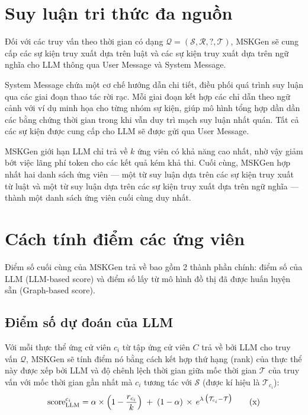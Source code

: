 \vspace{1em}
\section{Suy luận tri thức đa nguồn}
Đối với các truy vấn theo thời gian có dạng $\mathcal{Q = (S, R, ?, T)}$, MSKGen sẽ cung cấp các sự kiện truy xuất dựa trên luật và các sự kiện truy xuất dựa trên ngữ nghĩa cho LLM thông qua User Message và System Message.

System Message chứa một cơ chế hướng dẫn chi tiết, điều phối quá trình suy luận qua các giai đoạn thao tác rời rạc. Mỗi giai đoạn kết hợp các chỉ dẫn theo ngữ cảnh với ví dụ minh họa cho từng nhóm sự kiện, giúp mô hình tổng hợp dần dần các bằng chứng thời gian trong khi vẫn duy trì mạch suy luận nhất quán. Tất cả các sự kiện được cung cấp cho LLM sẽ được gửi qua User Message.

MSKGen giới hạn LLM chỉ trả về $k$ ứng viên có khả năng cao nhất, nhờ vậy giảm bớt việc lãng phí token cho các kết quả kém khả thi. Cuối cùng, MSKGen hợp nhất hai danh sách ứng viên — một từ suy luận dựa trên các sự kiện truy xuất từ luật và một từ suy luận dựa trên các sự kiện truy xuất dựa trên ngữ nghĩa — thành một danh sách ứng viên cuối cùng duy nhất.

\vspace{1em}
\section{Cách tính điểm các ứng viên}

Điểm số cuối cùng của MSKGen trả về bao gồm 2 thành phần chính: điểm số của LLM (LLM-based score) và điểm số lấy từ mô hình đồ thị đã được huấn luyện sẵn (Graph-based score).

\vspace{1em}
\subsection{Điểm số dự đoán của LLM}

Với mỗi thực thể ứng cử viên $c_i$ từ tập ứng cử viên $C$ trả về bởi LLM cho truy vấn $\mathcal{Q}$, MSKGen sẽ tính điểm nó bằng cách kết hợp thứ hạng (rank) của thực thể này được xếp bởi LLM và độ chênh lệch thời gian giữa mốc thời gian $\mathcal{T}$ của truy vấn với mốc thời gian gần nhất mà $c_i$ tương tác với $\mathcal{S}$ (được kí hiệu là $\mathcal{T}_{c_i}$):
\begin{equation}  
\label{eq:score-llm}  
\text{score}^{c_i}_{\text{LLM}}   
= \alpha \times \Bigl(1 - \frac{r_{c_i}}{k}\Bigr)  
\;+\; (1 - \alpha)\,\times\, e^{\lambda \,\bigl(\mathcal{T}_{c_i} - \mathcal{T}\bigr)}  
\tag{x}  
\end{equation}

